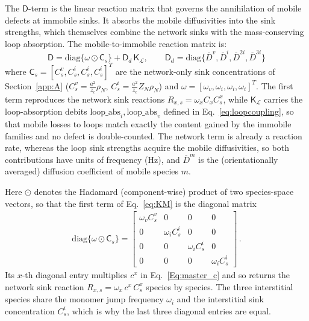 \documentclass{article}
\newcommand{\spvec}[1]{\bm{\mathsf{#1}}}   %
\newcommand{\spmat}[1]{\bm{\mathsf{#1}}}   %
\begin{document}
The $\spmat{D}$-term is the linear reaction matrix that governs the annihilation of mobile defects at immobile sinks. It absorbs the mobile diffusivities into the sink strengths, which themselves combine the network sinks with the mass-conserving loop absorption. The mobile-to-immobile reaction matrix is:
\begin{equation}\label{eq:KM}
\spmat{D}=\mathrm{diag}\{\spvec{\omega}\odot\spvec{C}_s\}+\spmat{D}_d\,\spmat{K}_{\mathcal L},\qquad
\spmat{D}_d=\mathrm{diag}\{\overline{D}^v,\overline{D}^i,\overline{D}^{2i},\overline{D}^{3i}\} 
\end{equation}
where $\spvec{C}_s=[C_s^v,C_s^i,C_s^i,C_s^i]^T$ are the network-only sink concentrations of Section~\ref{app:A} ($C_s^v=\tfrac{a^2}{z_c}\rho_N$, $C_s^i=\tfrac{a^2}{z_c}Z_N\rho_N$) and $\spvec{\omega}=[\omega_v,\omega_i,\omega_i,\omega_i]^T$. The first term reproduces the network sink reactions $R_{x,s}=\omega_x C_x C_s^x$, while $\spmat{K}_{\mathcal L}$ carries the loop-absorption debits $\text{loop\_abs}_i,\text{loop\_abs}_v$ defined in Eq.~\eqref{eq:loopcoupling}, so that mobile losses to loops match exactly the content gained by the immobile families and no defect is double-counted. The network term is already a reaction rate, whereas the loop sink strengths acquire the mobile diffusivities, so both contributions have units of frequency (Hz), and $\overline{D}^m$ is the (orientationally averaged) diffusion coefficient of mobile species $m$.

Here $\odot$ denotes the Hadamard (component-wise) product of two species-space vectors, so that the first term of Eq.~\eqref{eq:KM} is the diagonal matrix
\begin{align}\label{eq:omegaCs}
\mathrm{diag}\{\spvec{\omega}\odot\spvec{C}_s\}
=\begin{bmatrix}
\omega_v C_s^v & 0 & 0 & 0\\
0 & \omega_i C_s^i & 0 & 0\\
0 & 0 & \omega_i C_s^i & 0\\
0 & 0 & 0 & \omega_i C_s^i
\end{bmatrix}\, .
\end{align}
Its $x$-th diagonal entry multiplies $c^x$ in Eq.~\eqref{Eq:master_c} and so returns the network sink reaction $R_{x,s}=\omega_x\,c^x\,C_s^x$ species by species. The three interstitial species share the monomer jump frequency $\omega_i$ and the interstitial sink concentration $C_s^i$, which is why the last three diagonal entries are equal.
\end{document}
